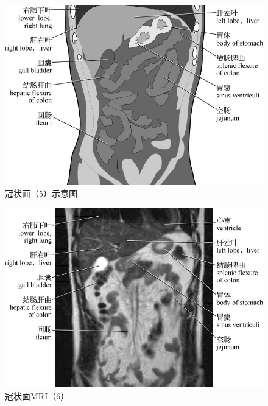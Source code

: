 \begin{figure}[!htbp]
 \centering
 \includegraphics{./images/Image00106.jpg}
 \captionsetup{justification=centering}
 \caption{冠状面（5）示意图}
  \end{figure} 
 \FloatBarrier

\begin{figure}[!htbp]
 \centering
 \includegraphics{./images/Image00107.jpg}
 \captionsetup{justification=centering}
 \caption{冠状面MRI（6）}
  \end{figure} 
 \FloatBarrier

